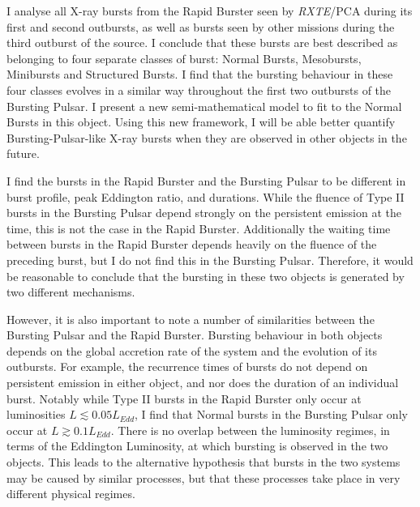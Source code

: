 \par I analyse all X-ray bursts from the Rapid Burster seen by \textit{RXTE}/PCA during its first and second outbursts, as well as bursts seen by other missions during the third outburst of the source.  I conclude that these bursts are best described as belonging to four separate classes of burst: Normal Bursts, Mesobursts, Minibursts and Structured Bursts.  I find that the bursting behaviour in these four classes evolves in a similar way throughout the first two outbursts of the Bursting Pulsar.  I present a new semi-mathematical model to fit to the Normal Bursts in this object.  Using this new framework, I will be able better quantify Bursting-Pulsar-like X-ray bursts when they are observed in other objects in the future.
\par I find the bursts in the Rapid Burster and the Bursting Pulsar to be different in burst profile, peak Eddington ratio, and durations.  While the fluence of Type II bursts in the Bursting Pulsar depend strongly on the persistent emission at the time, this is not the case in the Rapid Burster.  Additionally the waiting time between bursts in the Rapid Burster depends heavily on the fluence of the preceding burst, but I do not find this in the Bursting Pulsar.  Therefore, it would be reasonable to conclude that the bursting in these two objects is generated by two different mechanisms.
\par However, it is also important to note a number of similarities between the Bursting Pulsar and the Rapid Burster.  Bursting behaviour in both objects depends on the global accretion rate of the system and the evolution of its outbursts.  For example, the recurrence times of bursts do not depend on persistent emission in either object, and nor does the duration of an individual burst.  Notably while Type II bursts in the Rapid Burster only occur at luminosities $L\lesssim0.05L_{Edd}$, I find that Normal bursts in the Bursting Pulsar only occur at $L\gtrsim0.1L_{Edd}$.  There is no overlap between the luminosity regimes, in terms of the Eddington Luminosity, at which bursting is observed in the two objects.  This leads to the alternative hypothesis that bursts in the two systems may be caused by similar processes, but that these processes take place in very different physical regimes.